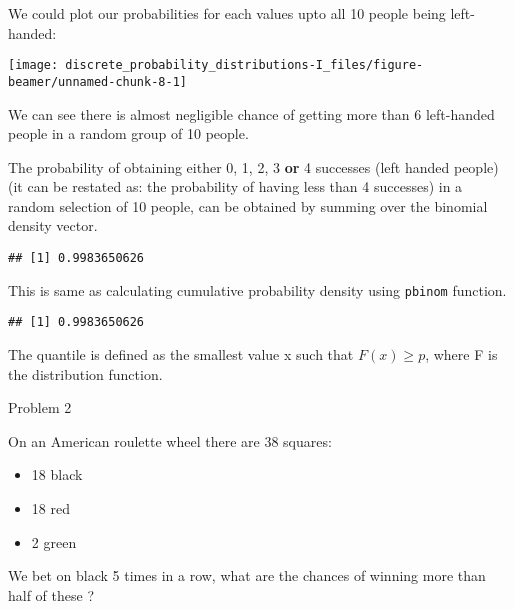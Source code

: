 \documentclass[ignorenonframetext,aspectratio=169]{beamer}
\providecommand{\tightlist}{%
  \setlength{\itemsep}{0pt}\setlength{\parskip}{0pt}}
\begin{document}
\begin{frame}{}
\protect\hypertarget{section-9}{}

We could plot our probabilities for each values upto all 10 people being
left-handed:

\texttt{[image: discrete\_probability\_distributions-I\_files/figure-beamer/unnamed-chunk-8-1]}

We can see there is almost negligible chance of getting more than 6
left-handed people in a random group of 10 people.

\end{frame}

\begin{frame}[fragile]{}
\protect\hypertarget{section-10}{}

The probability of obtaining either 0, 1, 2, 3 \textbf{or} 4 successes
(left handed people) (it can be restated as: the probability of having
less than 4 successes) in a random selection of 10 people, can be
obtained by summing over the binomial density vector.

\begin{verbatim}
## [1] 0.9983650626
\end{verbatim}

This is same as calculating cumulative probability density using
\texttt{pbinom} function.

\begin{verbatim}
## [1] 0.9983650626
\end{verbatim}

The quantile is defined as the smallest value x such that
\(F(x) \geq p\), where F is the distribution function.

\end{frame}

\begin{frame}{Problem 2}
\protect\hypertarget{problem-2-1}{}

On an American roulette wheel there are 38 squares:

\begin{itemize}
\tightlist
\item
  18 black
\item
  18 red
\item
  2 green
\end{itemize}

We bet on black 5 times in a row, what are the chances of winning more
than half of these ?

\end{frame}
\end{document}
